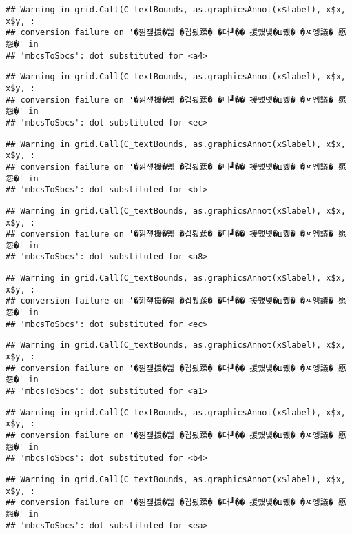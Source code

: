 \documentclass[
]{article}
\begin{document}
\begin{verbatim}
## Warning in grid.Call(C_textBounds, as.graphicsAnnot(x$label), x$x, x$y, :
## conversion failure on '�낆쟾援�쁾 �곕룄蹂� �대┛�� 援먰넻�ш퀬� �ㅼ엥議� 愿怨�' in
## 'mbcsToSbcs': dot substituted for <a4>
\end{verbatim}

\begin{verbatim}
## Warning in grid.Call(C_textBounds, as.graphicsAnnot(x$label), x$x, x$y, :
## conversion failure on '�낆쟾援�쁾 �곕룄蹂� �대┛�� 援먰넻�ш퀬� �ㅼ엥議� 愿怨�' in
## 'mbcsToSbcs': dot substituted for <ec>
\end{verbatim}

\begin{verbatim}
## Warning in grid.Call(C_textBounds, as.graphicsAnnot(x$label), x$x, x$y, :
## conversion failure on '�낆쟾援�쁾 �곕룄蹂� �대┛�� 援먰넻�ш퀬� �ㅼ엥議� 愿怨�' in
## 'mbcsToSbcs': dot substituted for <bf>
\end{verbatim}

\begin{verbatim}
## Warning in grid.Call(C_textBounds, as.graphicsAnnot(x$label), x$x, x$y, :
## conversion failure on '�낆쟾援�쁾 �곕룄蹂� �대┛�� 援먰넻�ш퀬� �ㅼ엥議� 愿怨�' in
## 'mbcsToSbcs': dot substituted for <a8>
\end{verbatim}

\begin{verbatim}
## Warning in grid.Call(C_textBounds, as.graphicsAnnot(x$label), x$x, x$y, :
## conversion failure on '�낆쟾援�쁾 �곕룄蹂� �대┛�� 援먰넻�ш퀬� �ㅼ엥議� 愿怨�' in
## 'mbcsToSbcs': dot substituted for <ec>
\end{verbatim}

\begin{verbatim}
## Warning in grid.Call(C_textBounds, as.graphicsAnnot(x$label), x$x, x$y, :
## conversion failure on '�낆쟾援�쁾 �곕룄蹂� �대┛�� 援먰넻�ш퀬� �ㅼ엥議� 愿怨�' in
## 'mbcsToSbcs': dot substituted for <a1>
\end{verbatim}

\begin{verbatim}
## Warning in grid.Call(C_textBounds, as.graphicsAnnot(x$label), x$x, x$y, :
## conversion failure on '�낆쟾援�쁾 �곕룄蹂� �대┛�� 援먰넻�ш퀬� �ㅼ엥議� 愿怨�' in
## 'mbcsToSbcs': dot substituted for <b4>
\end{verbatim}

\begin{verbatim}
## Warning in grid.Call(C_textBounds, as.graphicsAnnot(x$label), x$x, x$y, :
## conversion failure on '�낆쟾援�쁾 �곕룄蹂� �대┛�� 援먰넻�ш퀬� �ㅼ엥議� 愿怨�' in
## 'mbcsToSbcs': dot substituted for <ea>
\end{verbatim}
\end{document}
